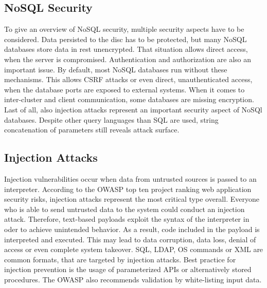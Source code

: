 \subsection{NoSQL Security}
To give an overview of NoSQL security, multiple security aspects have to be considered. Data persisted to the disc has to be protected, but many NoSQL databases store data in rest unencrypted. That situation allows direct access, when the server is compromised. Authentication and authorization are also an important issue. By default, most NoSQL databases run without these mechanisms. This allows CSRF attacks or even direct, unauthenticated access, when the database ports are exposed to external systems. When it comes to inter-cluster and client communication, some databases are missing encryption. Last of all, also injection attacks represent an important security aspect of NoSQl databases. Despite other query languages than SQL are used, string concatenation of parameters still reveals attack surface.    

\subsection{Injection Attacks}
Injection vulnerabilities occur when data from untrusted sources is passed to an interpreter. According to the OWASP top ten project ranking web application security risks, injection attacks represent the most critical type overall. Everyone who is able to send untrusted data to the system could conduct an injection attack. Therefore, text-based payloads exploit the syntax of the interpreter in oder to achieve unintended behavior. As a result, code included in the payload is interpreted and executed. This may lead to data corruption, data loss, denial of access or even complete system takeover. SQL, LDAP, OS commands or XML are common formats, that are targeted by injection attacks. Best practice for injection prevention is the usage of parameterized APIs or alternatively stored procedures. The OWASP also recommends validation by white-listing input data.
